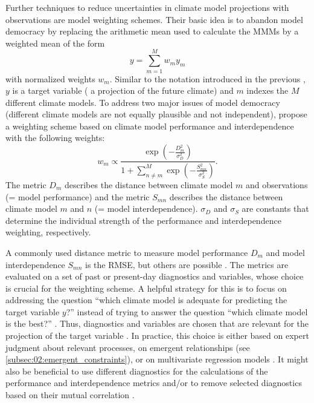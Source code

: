 Further techniques to reduce uncertainties in climate model projections with
observations are model weighting schemes. Their basic idea is to abandon model
democracy by replacing the arithmetic mean used to calculate the \acp{MMM} by a
weighted mean of the form
\begin{equation}
  y = \sum_{m=1}^{M} w_m y_m
  \label{eq:02:weighted_mean}
\end{equation}
with normalized weights $w_m$. Similar to the notation introduced in the
previous , $y$ is a target variable
(\eg{} a projection of the future climate) and $m$ indexes the $M$ different
climate models. To address two major issues of model democracy (different
climate models are not equally plausible and not independent),
\textcite{Knutti2017a} propose a weighting scheme based on climate model
performance and interdependence with the following weights:
\begin{equation}
  w_m \propto \frac{\exp \left( -\frac{D_m^2}{\sigma_D^2} \right)}{1 + \sum_{n
    \neq m}^{M} \exp \left( -\frac{S_{mn}^2}{\sigma_S^2} \right)}.
  \label{eq:02:knutti_weights}
\end{equation}
The metric $D_m$ describes the distance between climate model $m$ and
observations (= model performance) and the metric $S_{mn}$ describes the
distance between climate model $m$ and $n$ (= model interdependence).
$\sigma_D$ and $\sigma_S$ are constants that determine the individual strength
of the performance and interdependence weighting, respectively.

A commonly used distance metric to measure model performance $D_m$ and model
interdependence $S_{mn}$ is the \ac{RMSE}, but others are possible
\autocite{Knutti2017a}. The metrics are evaluated on a set of past or
present-day diagnostics and variables, whose choice is crucial for the
weighting scheme. A helpful strategy for this is to focus on addressing the
question \enquote{which climate model is adequate for predicting the target
  variable $y$?} instead of trying to answer the question \enquote{which
  climate model is the best?} \autocite{Parker2009}. Thus, diagnostics and
variables are chosen that are relevant for the projection of the target
variable \autocite{Knutti2017a}. In practice, this choice is either based on
expert judgment about relevant processes, on emergent relationships (see
\cref{subsec:02:emergent_constraints}), or on multivariate regression models
. It
might also be beneficial to use different diagnostics for the calculations of
the performance and interdependence metrics \autocite{Merrifield2020} and/or to
remove selected diagnostics based on their mutual correlation
\autocite{Lorenz2018}.

